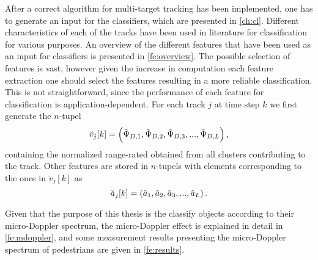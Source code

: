 After a correct algorithm for multi-target tracking has been implemented, one has to generate an input for the classifiers, which are presented in \cref{ch:cl}. Different characteristics of each of the tracks have been used in literature for classification for various purposes. An overview of the different features that have been used as an input for classifiers is presented in \cref{fe:overview}. The possible selection of features is vast, however given the increase in computation each feature extraction one should select the features resulting in a more reliable classification. This is not straightforward, since the performance of each feature for classification is application-dependent. For each track $j$ at time step $k$ we first generate the $n$-tupel
\begin{equation}
	\breve{v}_j[k] = \left(\hat{\Psi}_{D,1},\hat{\Psi}_{D,2},\hat{\Psi}_{D,3},...,\hat{\Psi}_{D,L}\right) \\,
\end{equation}
containing the normalized range-rated obtained from all clusters contributing to the track.  Other features are stored in $n$-tupels with elements corresponding to the ones in $\breve{v}_j[k]$ as
\begin{equation}
	\breve{a}_j[k] = \left(\hat{a}_{1},\hat{a}_{2},\hat{a}_{3},...,\hat{a}_{L}\right) \\.
\end{equation}

Given that the purpose of this thesis is the classify objects according to their micro-Doppler spectrum, the micro-Doppler effect is explained in detail in \cref{fe:mdoppler}, and some measurement results presenting the micro-Doppler spectrum of pedestrians are given in \cref{fe:results}. 